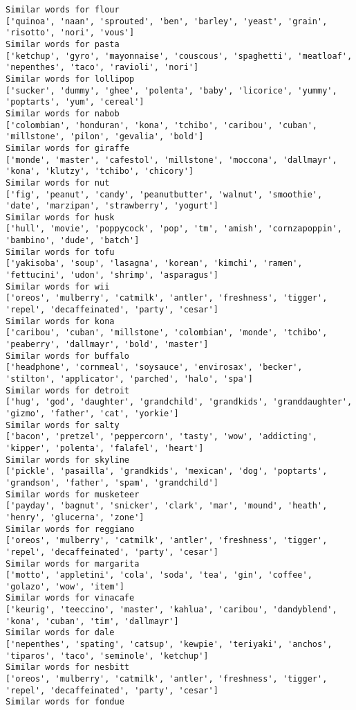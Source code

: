 \documentclass[11pt]{article}
\begin{document}
\begin{Verbatim}[commandchars=\\\{\}]
Similar words for flour
['quinoa', 'naan', 'sprouted', 'ben', 'barley', 'yeast', 'grain', 'risotto', 'nori', 'vous']
Similar words for pasta
['ketchup', 'gyro', 'mayonnaise', 'couscous', 'spaghetti', 'meatloaf', 'nepenthes', 'taco', 'ravioli', 'nori']
Similar words for lollipop
['sucker', 'dummy', 'ghee', 'polenta', 'baby', 'licorice', 'yummy', 'poptarts', 'yum', 'cereal']
Similar words for nabob
['colombian', 'honduran', 'kona', 'tchibo', 'caribou', 'cuban', 'millstone', 'pilon', 'gevalia', 'bold']
Similar words for giraffe
['monde', 'master', 'cafestol', 'millstone', 'moccona', 'dallmayr', 'kona', 'klutzy', 'tchibo', 'chicory']
Similar words for nut
['fig', 'peanut', 'candy', 'peanutbutter', 'walnut', 'smoothie', 'date', 'marzipan', 'strawberry', 'yogurt']
Similar words for husk
['hull', 'movie', 'poppycock', 'pop', 'tm', 'amish', 'cornzapoppin', 'bambino', 'dude', 'batch']
Similar words for tofu
['yakisoba', 'soup', 'lasagna', 'korean', 'kimchi', 'ramen', 'fettucini', 'udon', 'shrimp', 'asparagus']
Similar words for wii
['oreos', 'mulberry', 'catmilk', 'antler', 'freshness', 'tigger', 'repel', 'decaffeinated', 'party', 'cesar']
Similar words for kona
['caribou', 'cuban', 'millstone', 'colombian', 'monde', 'tchibo', 'peaberry', 'dallmayr', 'bold', 'master']
Similar words for buffalo
['headphone', 'cornmeal', 'soysauce', 'envirosax', 'becker', 'stilton', 'applicator', 'parched', 'halo', 'spa']
Similar words for detroit
['hug', 'god', 'daughter', 'grandchild', 'grandkids', 'granddaughter', 'gizmo', 'father', 'cat', 'yorkie']
Similar words for salty
['bacon', 'pretzel', 'peppercorn', 'tasty', 'wow', 'addicting', 'kipper', 'polenta', 'falafel', 'heart']
Similar words for skyline
['pickle', 'pasailla', 'grandkids', 'mexican', 'dog', 'poptarts', 'grandson', 'father', 'spam', 'grandchild']
Similar words for musketeer
['payday', 'bagnut', 'snicker', 'clark', 'mar', 'mound', 'heath', 'henry', 'glucerna', 'zone']
Similar words for reggiano
['oreos', 'mulberry', 'catmilk', 'antler', 'freshness', 'tigger', 'repel', 'decaffeinated', 'party', 'cesar']
Similar words for margarita
['motto', 'appletini', 'cola', 'soda', 'tea', 'gin', 'coffee', 'golazo', 'wow', 'item']
Similar words for vinacafe
['keurig', 'teeccino', 'master', 'kahlua', 'caribou', 'dandyblend', 'kona', 'cuban', 'tim', 'dallmayr']
Similar words for dale
['nepenthes', 'spating', 'catsup', 'kewpie', 'teriyaki', 'anchos', 'tiparos', 'taco', 'seminole', 'ketchup']
Similar words for nesbitt
['oreos', 'mulberry', 'catmilk', 'antler', 'freshness', 'tigger', 'repel', 'decaffeinated', 'party', 'cesar']
Similar words for fondue

\end{Verbatim}
\end{document}
